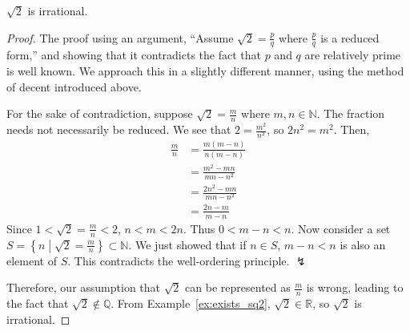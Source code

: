 \documentclass[../main.tex]{subfiles}
\begin{document}
\begin{thm}
    $\sqrt 2$ is irrational.
\end{thm}
\begin{proof}
    The proof using an argument, ``Assume $\sqrt 2 = \frac p q$ where $\frac p q$ is a reduced form,'' and showing that it contradicts the fact that $p$ and $q$ are relatively prime is well known.
    We approach this in a slightly different manner, using the method of decent introduced above.

    For the sake of contradiction, suppose $\sqrt 2 = \frac m n$ where $m, n \in \mathbb{N}$.
    The fraction needs not necessarily be reduced.
    We see that $2 = \frac{m^2}{n^2}$, so $2n^2 = m^2$.
    Then,
    \begin{align*}
        \frac m n &= \frac{m(m - n)}{n(m - n)}\\
                  &= \frac{m^2 - mn}{mn - n^2}\\
                  &= \frac{2n^2 - mn}{mn - n^2}\\
                  &= \frac{2n - m}{m - n}
    \end{align*}
    Since $1 < \sqrt 2 = \frac m n < 2$, $n < m < 2n$.
    Thus $0 < m - n < n$.
    Now consider a set $S = \left\{ n \middle| \sqrt 2 = \frac m n \right\} \subset \mathbb N$.
    We just showed that if $n \in S$, $m-n < n$ is also an element of $S$.
    This contradicts the well-ordering principle. $\lightning$

    Therefore, our assumption that $\sqrt 2$ can be represented as $\frac m n$ is wrong, leading to the fact that $\sqrt 2 \notin \mathbb Q$.
    From Example~\ref{ex:exists_sq2}, $\sqrt 2 \in \mathbb R$, so $\sqrt 2$ is irrational.
\end{proof}
\end{document}
